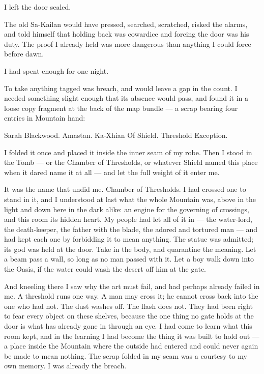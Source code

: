I left the door sealed.\par

The old Sa-Kailan would have pressed, searched, scratched, risked the alarms, and told himself that holding back was cowardice and forcing the door was his duty. The proof I already held was more dangerous than anything I could force before dawn.\par

I had spent enough for one night.\par

To take anything tagged was breach, and would leave a gap in the count. I needed something slight enough that its absence would pass, and found it in a loose copy fragment at the back of the map bundle --- a scrap bearing four entries in Mountain hand:\par

Sarah Blackwood. Amastan. Ka-Xhian Of Shield. Threshold Exception.\par

I folded it once and placed it inside the inner seam of my robe. Then I stood in the Tomb --- or the Chamber of Thresholds, or whatever Shield named this place when it dared name it at all --- and let the full weight of it enter me.\par

It was the name that undid me. Chamber of Thresholds. I had crossed one to stand in it, and I understood at last what the whole Mountain was, above in the light and down here in the dark alike: an engine for the governing of crossings, and this room its hidden heart. My people had let all of it in --- the water-lord, the death-keeper, the father with the blade, the adored and tortured man --- and had kept each one by forbidding it to mean anything. The statue was admitted; its god was held at the door. Take in the body, and quarantine the meaning. Let a beam pass a wall, so long as no man passed with it. Let a boy walk down into the Oasis, if the water could wash the desert off him at the gate.\par

And kneeling there I saw why the art must fail, and had perhaps already failed in me. A threshold runs one way. A man may cross it; he cannot cross back into the one who had not. The dust washes off. The flash does not. They had been right to fear every object on these shelves, because the one thing no gate holds at the door is what has already gone in through an eye. I had come to learn what this room kept, and in the learning I had become the thing it was built to hold out --- a place inside the Mountain where the outside had entered and could never again be made to mean nothing. The scrap folded in my seam was a courtesy to my own memory. I was already the breach.\par

